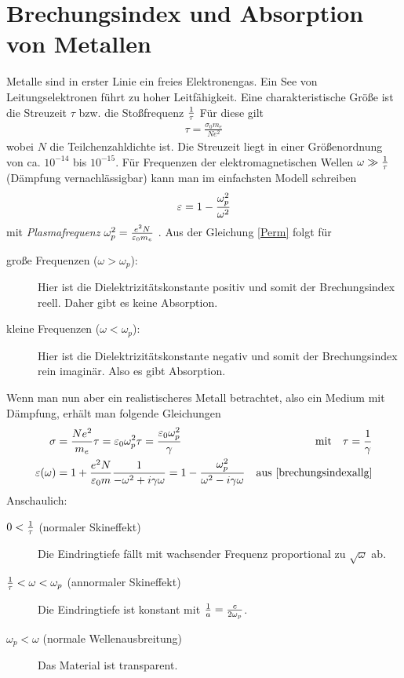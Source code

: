 \section{Brechungsindex und Absorption von Metallen}
Metalle sind in erster Linie ein freies Elektronengas. Ein See von
Leitungselektronen führt zu hoher Leitfähigkeit. Eine
charakteristische Größe ist die 
Streuzeit $\tau$%
%
bzw. 
die Stoßfrequenz $\frac{1}{\tau}$%
%
Für diese gilt
\begin{align*}
	\tau=\frac{\sigma_0m_e}{N e^2}
\end{align*}
wobei 
$N$ die Teilchenzahldichte ist.
Die Streuzeit liegt in einer Größenordnung von
ca. $10^{-14}$ bis $10^{-15}$. Für Frequenzen der elektromagnetischen Wellen
$\omega\gg\frac{1}{\tau}$ (Dämpfung vernachlässigbar) kann man im
einfachsten Modell schreiben
\begin{gather}
  \varepsilon = 1 - \frac{\omega_p^2}{\omega^2} \label{Perm}
\end{gather}
mit \emph{Plasmafrequenz}
$\omega_p^2=\frac{e^2N}{\varepsilon_0 m_e}$%
%
.
Aus der Gleichung \ref{Perm} folgt für
\begin{description}
	\item[große Frequenzen ($\omega>\omega_p$):] Hier ist die
      Dielektrizitätskonstante positiv und somit der Brechungsindex
      reell. Daher gibt es keine Absorption. 
	\item[kleine Frequenzen ($\omega<\omega_p$):] Hier ist die
      Dielektrizitätskonstante negativ und somit der Brechungsindex
      rein imaginär. Also es gibt Absorption. 
\end{description}
Wenn man nun aber ein realistischeres Metall betrachtet, also ein Medium
mit Dämpfung, erhält man folgende Gleichungen
\begin{align*}
  \sigma
  &= \frac{Ne^2}{m_e}\tau
    = \varepsilon_0\omega_p^2 \tau
    = \frac{\varepsilon_0\omega_p^2}{\gamma}
  &\text{mit}\quad \tau=\frac{1}{\gamma}\\
  \varepsilon(\omega)
  &= 1 + \frac{e^2N}{\varepsilon_0 m}\frac{1}{-\omega^2+i\gamma\omega}
    = 1 - \frac{\omega_p^2}{\omega^2-i\gamma\omega}
  &\text{aus \eqref{brechungsindexallg}}
\end{align*}%
%
Anschaulich:
\begin{description}
  \item[$0 < \frac{1}{\tau}$ (normaler Skineffekt)]
    Die Eindringtiefe fällt mit wachsender Frequenz proportional zu
      $\sqrt{\omega}$ ab.
  \item[$\frac{1}{\tau}<\omega<\omega_p$ (annormaler Skineffekt)]
    Die Eindringtiefe ist konstant mit $\frac{1}{a}=\frac{c}{2\omega_p}$.
  \item[$\omega_p<\omega$ (normale Wellenausbreitung)]
    Das Material ist transparent.
\end{description}


